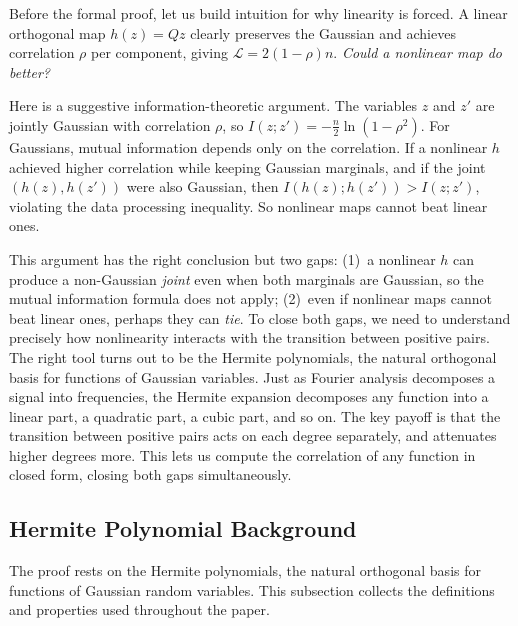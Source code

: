 Before the formal proof, let us build intuition for why linearity is forced.
A linear orthogonal map $h(z) = Qz$ clearly preserves the Gaussian and achieves correlation $\rho$ per component, giving $\mathcal{L} = 2(1-\rho)n$.
\textit{Could a nonlinear map do better?}

Here is a suggestive information-theoretic argument.
The variables $z$ and $z'$ are jointly Gaussian with correlation $\rho$, so $I(z; z') = -\frac{n}{2}\ln(1-\rho^2)$.
For Gaussians, mutual information depends only on the correlation.
If a nonlinear $h$ achieved higher correlation while keeping Gaussian marginals, and if the joint $(h(z), h(z'))$ were also Gaussian, then $I(h(z); h(z')) > I(z; z')$, violating the data processing inequality.
So nonlinear maps cannot beat linear ones.

This argument has the right conclusion but two gaps: (1)~a nonlinear $h$ can produce a non-Gaussian \textit{joint} even when both marginals are Gaussian, so the mutual information formula does not apply; (2)~even if nonlinear maps cannot beat linear ones, perhaps they can \textit{tie}.
To close both gaps, we need to understand precisely how nonlinearity interacts with the transition between positive pairs.
The right tool turns out to be the Hermite polynomials, the natural orthogonal basis for functions of Gaussian variables.
Just as Fourier analysis decomposes a signal into frequencies, the Hermite expansion decomposes any function into a linear part, a quadratic part, a cubic part, and so on.
The key payoff is that the transition between positive pairs acts on each degree separately, and attenuates higher degrees more.
This lets us compute the correlation of any function in closed form, closing both gaps simultaneously.


\subsection{Hermite Polynomial Background}\label{app:hermite-details}

The proof rests on the Hermite polynomials, the natural orthogonal basis for functions of Gaussian random variables.
This subsection collects the definitions and properties used throughout the paper.

